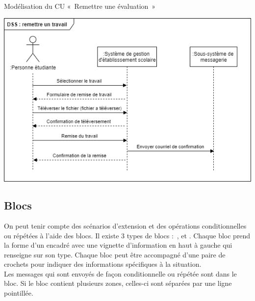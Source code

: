 \begin{exemple}[label={ex:modelisation-cu-1}]{Modélisation du CU «~Remettre une évaluation~» }
	\begin{center} 
		\includegraphics[width=.95\textwidth]{dss-Exemple-simple.png}
	\end{center}  
\end{exemple}

\subsection{Blocs}

On peut tenir compte des scénarios d'extension et des opérations conditionnelles ou répétées à l'aide des blocs. Il existe 3 types de blocs :~,  et . Chaque bloc prend la forme d'un encadré avec une vignette d'information en haut à gauche qui renseigne sur son type. Chaque bloc peut être accompagné d'une paire de crochets pour indiquer des informations spécifiques à la situation.\\

Les messages qui sont envoyés de façon conditionnelle ou répétée sont dans le bloc. Si le bloc contient plusieurs zones, celles-ci sont séparées par une ligne pointillée.

